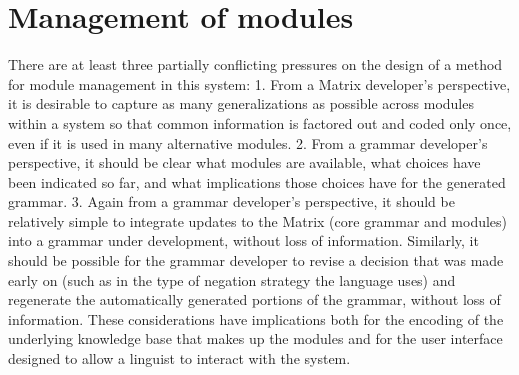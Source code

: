\section{Management of modules}
\label{management}

There are at least three partially conflicting pressures on the design
of a method for module management in this system: 1. From a Matrix developer's
perspective, it is desirable to capture as many generalizations as
possible across modules within a system so that common information is
factored out and coded only once, even if it is used in many
alternative modules. 2. From a grammar developer's perspective, it should be clear
what modules are available, what choices have been indicated so far,
and what implications those choices have for the generated grammar.
3. Again from a grammar developer's perspective, it should be relatively simple to
integrate updates to the Matrix (core grammar and modules) into a
grammar under development, without loss of information.
Similarly, it should be possible for the grammar
developer to revise a decision that was made early on (such as in the
type of negation strategy the language uses) and regenerate the
automatically generated portions of the grammar, without loss of
information.  These considerations have implications both for the
encoding of the underlying knowledge base that makes up the modules
and for the user interface designed to allow a linguist to interact
with the system.

